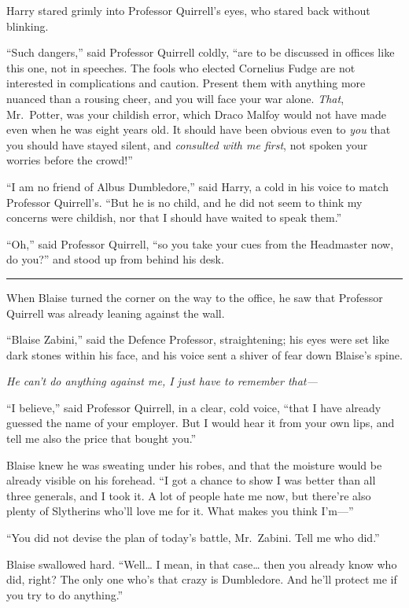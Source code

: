 Harry stared grimly into Professor Quirrell's eyes, who stared back
without blinking.

``Such dangers,'' said Professor Quirrell coldly, ``are to be discussed
in offices like this one, not in speeches. The fools who elected
Cornelius Fudge are not interested in complications and caution. Present
them with anything more nuanced than a rousing cheer, and you will face
your war alone. \emph{That}, Mr.~Potter, was your childish error, which
Draco Malfoy would not have made even when he was eight years old. It
should have been obvious even to \emph{you} that you should have stayed
silent, and \emph{consulted with me first}, not spoken your worries
before the crowd!''

``I am no friend of Albus Dumbledore,'' said Harry, a cold in his voice
to match Professor Quirrell's. ``But he is no child, and he did not seem
to think my concerns were childish, nor that I should have waited to
speak them.''

``Oh,'' said Professor Quirrell, ``so you take your cues from the
Headmaster now, do you?'' and stood up from behind his desk.

\begin{center}\rule{3in}{0.4pt}\end{center}

When Blaise turned the corner on the way to the office, he saw that
Professor Quirrell was already leaning against the wall.

``Blaise Zabini,'' said the Defence Professor, straightening; his eyes
were set like dark stones within his face, and his voice sent a shiver
of fear down Blaise's spine.

\emph{He can't do anything against me, I just have to remember that---}

``I believe,'' said Professor Quirrell, in a clear, cold voice, ``that I
have already guessed the name of your employer. But I would hear it from
your own lips, and tell me also the price that bought you.''

Blaise knew he was sweating under his robes, and that the moisture would
be already visible on his forehead. ``I got a chance to show I was
better than all three generals, and I took it. A lot of people hate me
now, but there're also plenty of Slytherins who'll love me for it. What
makes you think I'm---''

``You did not devise the plan of today's battle, Mr.~Zabini. Tell me who
did.''

Blaise swallowed hard. ``Well\ldots{} I mean, in that case\ldots{} then
you already know who did, right? The only one who's that crazy is
Dumbledore. And he'll protect me if you try to do anything.''

